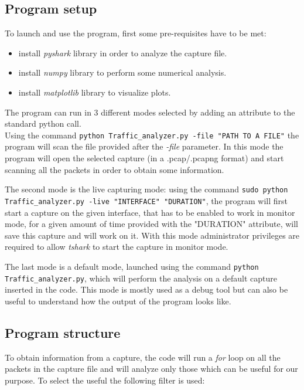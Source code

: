 \subsection{Program setup}
To launch and use the program, first some pre-requisites have to be met:
\begin{itemize}
    \item install \textit{pyshark} library in order to analyze the capture file.
    \item install \textit{numpy} library to perform some numerical analysis.
    \item install \textit{matplotlib} library to visualize plots.
\end{itemize}
The program can run in 3 different modes selected by adding an attribute to the standard 
python call.\\
Using the command \texttt{python Traffic\_analyzer.py -file "PATH TO A FILE"} 
the program will scan the file provided after the \textit{-file} parameter. In this mode the program
will open the selected capture (in a .pcap/.pcapng format) and start scanning all the packets in 
order to obtain some information. 

The second mode is the live capturing mode: using the command \texttt{sudo python
Traffic\_analyzer.py -live "INTERFACE" "DURATION"}, the program will first start a 
capture on the given interface, that has to be enabled to work in monitor mode, for a given 
amount of time provided with the "DURATION" attribute, will save this capture and will work
on it. With this mode administrator privileges are required to allow \textit{tshark} to start the 
capture in monitor mode.  

The last mode is a default mode, launched using the command \texttt{python Traffic\_analyzer.py},
which will perform the analysis on a default capture inserted in the code. This mode is mostly 
used as a debug tool but can also be useful to understand how the output of the program looks like.

\subsection{Program structure}
To obtain information from a capture, the code will run a \textit{for} loop on all the packets in the 
capture file and will analyze only those which can be useful for our purpose. To select the 
useful the following filter is used:

